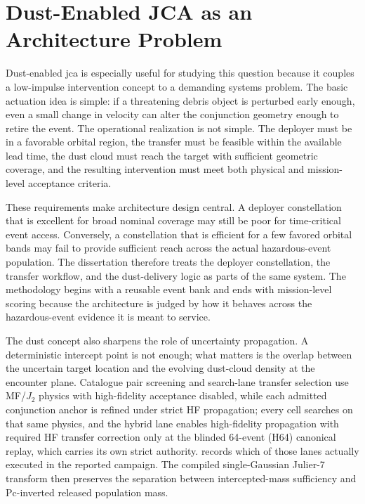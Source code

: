 \section{Dust-Enabled JCA as an Architecture Problem}
Dust-enabled \gls{jca} is especially useful for studying this question because it couples a low-impulse intervention concept to a demanding systems problem. The basic actuation idea is simple: if a threatening debris object is perturbed early enough, even a small change in velocity can alter the conjunction geometry enough to retire the event. The operational realization is not simple. The deployer must be in a favorable orbital region, the transfer must be feasible within the available lead time, the dust cloud must reach the target with sufficient geometric coverage, and the resulting intervention must meet both physical and mission-level acceptance criteria.

These requirements make architecture design central. A deployer constellation that is excellent for broad nominal coverage may still be poor for time-critical event access. Conversely, a constellation that is efficient for a few favored orbital bands may fail to provide sufficient reach across the actual hazardous-event population. The dissertation therefore treats the deployer constellation, the transfer workflow, and the dust-delivery logic as parts of the same system. The methodology begins with a reusable event bank and ends with mission-level scoring because the architecture is judged by how it behaves across the hazardous-event evidence it is meant to service.

The dust concept also sharpens the role of uncertainty propagation. A deterministic intercept point is not enough; what matters is the overlap between the uncertain target location and the evolving dust-cloud density at the encounter plane. Catalogue pair screening and search-lane transfer selection use MF/\(J_2\) physics with high-fidelity acceptance disabled, while each admitted conjunction anchor is refined under strict HF propagation; every cell searches on that same physics, and the hybrid lane enables high-fidelity propagation with required HF transfer correction only at the blinded 64-event (H64) canonical replay, which carries its own strict authority.  records which of those lanes actually executed in the reported campaign. The compiled single-Gaussian Julier-7 transform then preserves the separation between intercepted-mass sufficiency and Pc-inverted released population mass.

